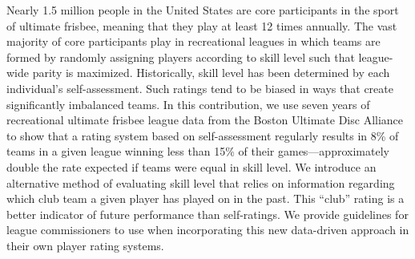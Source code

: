 Nearly 1.5 million people in the United States are core participants in the sport of ultimate frisbee, meaning that they play at least 12 times annually. The vast majority of core participants play in recreational leagues in which teams are formed by randomly assigning players according to skill level such that league-wide parity is maximized. Historically, skill level has been determined by each individual’s self-assessment. Such ratings tend to be biased in ways that create significantly imbalanced teams. In this contribution, we use seven years of recreational ultimate frisbee league data from the Boston Ultimate Disc Alliance to show that a rating system based on self-assessment regularly results in 8\% of teams in a given league winning less than 15\% of their games---approximately double the rate expected if teams were equal in skill level. We introduce an alternative method of evaluating skill level that relies on information regarding which club team a given player has played on in the past. This ``club'' rating is a better indicator of future performance than self-ratings. We provide guidelines for league commissioners to use when incorporating this new data-driven approach in their own player rating systems.